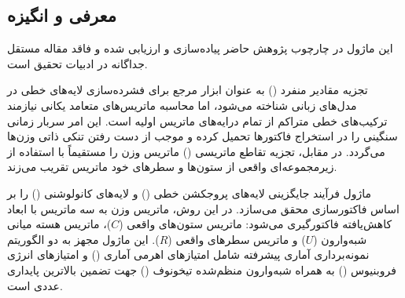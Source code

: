 \subsection{معرفی و انگیزه}
این ماژول در چارچوب پژوهش حاضر پیاده‌سازی و ارزیابی شده و فاقد مقاله مستقل جداگانه در ادبیات تحقیق است.

تجزیه مقادیر منفرد () به عنوان ابزار مرجع برای فشرده‌سازی لایه‌های خطی در مدل‌های زبانی شناخته می‌شود، اما محاسبه ماتریس‌های متعامد یکانی نیازمند ترکیب‌های خطی متراکم از تمام درایه‌های ماتریس اولیه است. این امر سربار زمانی سنگینی را در استخراج فاکتورها تحمیل کرده و موجب از دست رفتن تنکی ذاتی وزن‌ها می‌گردد. در مقابل، تجزیه تقاطع ماتریسی () ماتریس وزن را مستقیماً با استفاده از زیرمجموعه‌ای واقعی از ستون‌ها و سطرهای خود ماتریس تقریب می‌زند.

ماژول  فرآیند جایگزینی لایه‌های پروجکشن خطی () و لایه‌های کانولوشنی () را بر اساس فاکتورسازی  محقق می‌سازد. در این روش، ماتریس وزن به سه ماتریس با ابعاد کاهش‌یافته فاکتورگیری می‌شود: ماتریس ستون‌های واقعی ($C$)، ماتریس هسته میانی شبه‌وارون ($U$) و ماتریس سطرهای واقعی ($R$). این ماژول مجهز به دو الگوریتم نمونه‌برداری آماری پیشرفته شامل امتیازهای اهرمی آماری () و امتیازهای انرژی فروبنیوس () به همراه شبه‌وارون منظم‌شده تیخونوف () جهت تضمین بالاترین پایداری عددی است.
